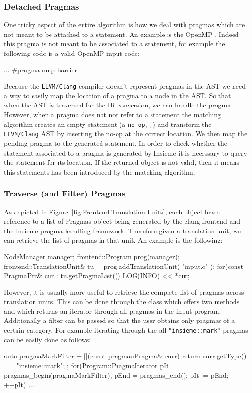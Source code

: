 \subsubsection{Detached Pragmas} 
One tricky aspect of the entire algorithm is how we deal with pragmas which are
not meant to be attached to a statement. An example is the OpenMP . Indeed this pragma is not meant to be associated to a statement,
for example the following code is a valid OpenMP input code:

\begin{srcCode}
{
	...
	#pragma omp barrier
}
\end{srcCode}

Because the {\tt LLVM/Clang} compiler doesn't represent pragmas in the AST we
need a way to easily map the location of a pragma to a node in the AST. So that
when the AST is traversed for the IR conversion, we can handle the pragma.
However, when a pragma does not not refer to a statement the matching algorithm
creates an empty statement (a {\tt no-op}, {\tt ;}) and transform the {\tt
LLVM/Clang} AST by inserting the no-op at the correct location. We then map the
pending pragma to the generated statement. In order to check whether
the statement associated to a pragma is generated by Insieme it is necessary to
query the statement for its location. If the returned
 object is not valid, then it means this statements
has been introduced by the matching algorithm. 

\subsubsection{Traverse (and Filter) Pragmas}

As depicted in Figure~\ref{fig:Frontend.Translation.Units}, each
 object has a reference to a list of Pragmas
object being generated by the clang frontend and the Insieme pragma handling
framework. Therefore given a translation unit, we can retrieve the list of
pragmas in that unit. An example is the following: 

\begin{srcCode}
NodeManager manager;
frontend::Program prog(manager);
frontend::TranslationUnit& tu = prog.addTranslationUnit( "input.c" );
for(const PragmaPtr& cur : tu.getPragmaList()) { LOG(INFO) << *cur; }
\end{srcCode}

However, it is usually more useful to retrieve the complete list of pragmas
across translation units. This can be done through the 
class which offers two methods  and 
which returns an iterator through all pragmas in the input program. Additionally
a filter can be passed so that the user obtains only pragmas of a certain
category. For example iterating through the all {\tt "insieme::mark"} pragmas
can be easily done as follows:

\begin{srcCode}
auto pragmaMarkFilter = [](const pragma::Pragma& curr) { 
	return curr.getType() == "insieme::mark"; 
};
for(Program::PragmaIterator pIt = pragmas_begin(pragmaMarkFilter), 
							pEnd = pragmas_end(); pIt != pEnd; ++pIt) 
{ ... }
\end{srcCode}

